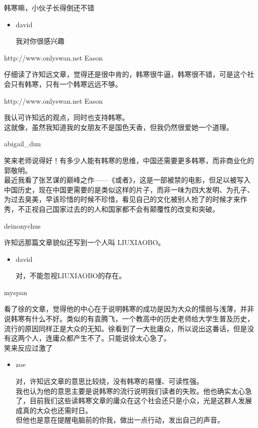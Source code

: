 韩寒嘛，小伙子长得倒还不错

\begin{itemize}[<+->]
\item
  david

  我对你很感兴趣
\end{itemize}

http://www.onlyswan.net Eason

仔细读了许知远文章，觉得还是很中肯的，韩寒很牛逼，韩寒很不错，可是这个社会只有韩寒，只有一个韩寒远远不够。

http://www.onlyswan.net Eason

我认可许知远的观点，同时也支持韩寒。\\
这就像，虽然我知道我的女朋友不是国色天香，但我仍然很爱她一个道理。

abigail\_dun

笑来老师说得好！有多少人能有韩寒的思维，中国还需要更多韩寒，而非商业化的郭敬明。\\
最近我看了张艺谋的巅峰之作------《或者》，这是一部被禁的电影，但足以被写入中国历史，现在中国更需要的是类似这样的片子，而非一味为四大发明、为孔子、为过去臭美，早该珍惜的时候不珍惜，看见自己的文化被别人抢了的时候才来作秀，不正视自己国家过去的的人和国家都不会有颠覆性的改变和突破。

deinonychus

许知远那篇文章貌似还写到一个人叫 LIUXIAOBO。

\begin{itemize}[<+->]
\item
  david

  对，不能忽视LIUXIAOBO的存在。
\end{itemize}

myspan

看了徐的文章，觉得他的中心在于说明韩寒的成功是因为大众的懦弱与浅薄，并非说韩寒有什么不好。类似的有袁腾飞，一个教高中的历史老师给大学生普及历史，流行的原因同样正是大众的无知。徐看到了一大批庸众，所以说出这番话，但是没有这两个人，连庸众都产生不了。只能说徐太心急了。\\
笑来反应过激了

\begin{itemize}[<+->]
\item
  zoe

  对，许知远文章的意思比较绕，没有韩寒的易懂、可读性强。\\
  我也认为他的意思主要是说韩寒的流行说明我们读者的失败。他也确实太心急了，目前我们这些读韩寒文章的庸众在这个社会还只是小众，光是这群人发展成真的大众也还需时日。\\
  但他也是意在提醒电脑前的你我，做出一点行动，发出自己的声音。
\end{itemize}

